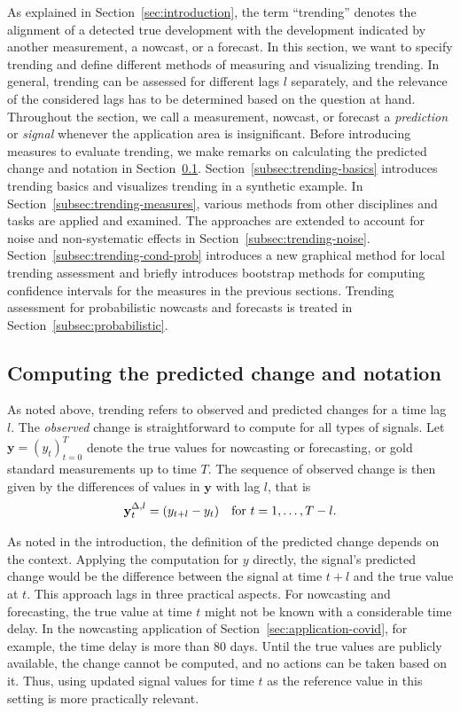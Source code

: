 
As explained in Section~\ref{sec:introduction}, the term \enquote{trending} denotes the alignment of a detected true development with the development indicated by another measurement, a nowcast, or a forecast.
In this section, we want to specify trending and define different methods of measuring and visualizing trending.
In general, trending can be assessed for different lags $l$ separately, and the relevance of the considered lags has to be determined based on the question at hand.
Throughout the section, we call a measurement, nowcast, or forecast a \textit{prediction} or \textit{signal} whenever the application area is insignificant.
Before introducing measures to evaluate trending, we make remarks on calculating the predicted change and notation in Section~\ref{subsec:notation}.
Section~\ref{subsec:trending-basics} introduces trending basics and visualizes trending in a synthetic example.
In Section~\ref{subsec:trending-measures}, various methods from other disciplines and tasks are applied and examined.
The approaches are extended to account for noise and non-systematic effects in Section~\ref{subsec:trending-noise}.
Section~\ref{subsec:trending-cond-prob} introduces a new graphical method for local trending assessment and briefly introduces bootstrap methods for computing confidence intervals for the measures in the previous sections.
Trending assessment for probabilistic nowcasts and forecasts is treated in Section~\ref{subsec:probabilistic}.

\subsection{Computing the predicted change and notation}\label{subsec:notation}

As noted above, trending refers to observed and predicted changes for a time lag $l$.
The \textit{observed} change is straightforward to compute for all types of signals.
Let $\mathbf{y} = (y_t)_{t=0}^T$ denote the true values for nowcasting or forecasting, or gold standard measurements up to time $T$.
The sequence of observed change is then given by the differences of values in $\mathbf{y}$ with lag $l$, that is
\begin{equation}\label{eq:diffy}
    \mathbf{y}^{\Delta,l}_t = (y_{t+l} - y_t) \quad \text{for}\ t = 1, \dots, T - l.
\end{equation}


As noted in the introduction, the definition of the predicted change depends on the context.
Applying the computation for $y$ directly, the signal's predicted change would be the difference between the signal at time $t + l$ and the true value at $t$.
This approach lags in three practical aspects.
For nowcasting and forecasting, the true value at time $t$ might not be known with a considerable time delay.
In the nowcasting application of Section~\ref{sec:application-covid}, for example, the time delay is more than 80 days.
Until the true values are publicly available, the change cannot be computed, and no actions can be taken based on it.
Thus, using updated signal values for time $t$ as the reference value in this setting is more practically relevant.

